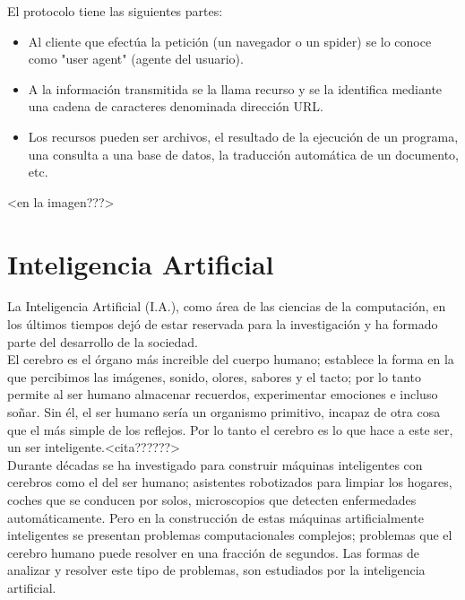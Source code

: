 El protocolo tiene las siguientes partes:
\begin{itemize}
    \item Al cliente que efectúa la petición (un navegador o un spider) se lo conoce como "user agent" (agente del usuario). 
    \item A la información transmitida se la llama recurso y se la identifica mediante una cadena de caracteres denominada dirección URL.
    \item Los recursos pueden ser archivos, el resultado de la ejecución de un programa, una consulta a una base de datos, la traducción automática de un documento, etc.
\end{itemize}

<en la imagen???>

\section{Inteligencia Artificial}
La Inteligencia Artificial (I.A.), como área de las ciencias de la computación, en los últimos tiempos dejó de estar reservada para la investigación y ha formado parte del desarrollo de la sociedad.\\

El cerebro es el órgano más increible del cuerpo humano; establece la forma en la que percibimos las imágenes, sonido, olores, sabores y el tacto; por lo tanto permite al ser humano almacenar recuerdos, experimentar emociones e incluso soñar. Sin él, el ser humano sería un organismo primitivo, incapaz de otra cosa que el más simple de los reflejos. Por lo tanto el cerebro es lo que hace a este ser, un ser inteligente.<cita??????>\\

Durante décadas se ha investigado para construir máquinas inteligentes con cerebros como el del ser humano; asistentes robotizados para limpiar los hogares, coches que se conducen por solos, microscopios que detecten enfermedades automáticamente. Pero en la construcción de estas máquinas artificialmente inteligentes se presentan problemas computacionales complejos; problemas que el cerebro humano puede resolver en una fracción de segundos. Las formas de analizar y resolver este tipo de problemas, son estudiados por la inteligencia artificial.

